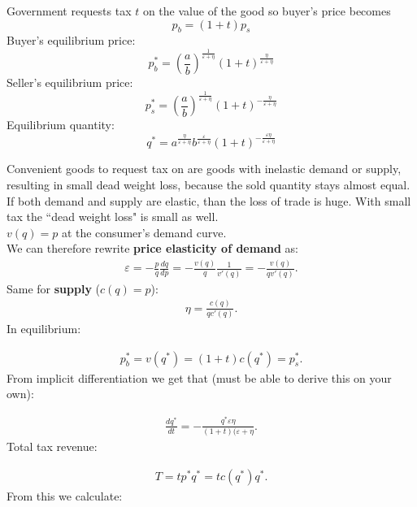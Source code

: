 \documentclass[12pt, a4paper, titlepage]{extarticle}
\begin{document}
	Government requests tax $t$ on the value of the good so buyer's price becomes
	\[p_b = (1 + t)p_s \]
	Buyer's equilibrium price:
	\[p_b^* = (\frac{a}{b})^{\frac{1}{\varepsilon + \eta}}(1 + t)^{\frac{\eta}{\varepsilon + \eta}} \]
	Seller's equilibrium price:
	\[p_s^* = (\frac{a}{b})^{\frac{1}{\varepsilon + \eta}}(1 + t)^{-\frac{\eta}{\varepsilon + \eta}} \]
	Equilibrium quantity:
	\[q^* = a^{\frac{\eta}{\varepsilon + \eta}}b^{\frac{\varepsilon}{\varepsilon + \eta}}(1 + t)^{-\frac{\varepsilon\eta}{\varepsilon + \eta}} \]
	
	Convenient goods to request tax on are goods with inelastic demand or supply, resulting in small dead weight loss, because the sold quantity stays almost equal.\\
	If both demand and supply are elastic, than the loss of trade is huge.
	With small tax the ``dead weight loss" is small as well.
	\\
	$v(q) = p$ at the consumer's demand curve.\\
	We can therefore rewrite \textbf{price elasticity of demand} as:
	\begin{equation}
		\begin{gathered}
			\varepsilon = -\frac{p}{q}\frac{dq}{dp} = -\frac{v(q)}{q}\frac{1}{v'(q)} = -\frac{v(q)}{qv'(q)}.
		\end{gathered}
	\end{equation}
	Same for \textbf{supply} ($c(q) = p$):
	\begin{equation}
		\begin{gathered}
			\eta = \frac{c(q)}{qc'(q)}.
		\end{gathered}
	\end{equation}
	In equilibrium:
	
	\begin{equation}
		\begin{gathered}
			p_b^* = v(q^*) = (1 + t)c(q^*) = p_s^*.
		\end{gathered}
	\end{equation}
	From implicit differentiation we get that (must be able to derive this on your own):
	
	\begin{equation}
		\begin{gathered}
			\frac{dq^*}{dt} = -\frac{q^*\varepsilon\eta}{(1 + t)(\varepsilon + \eta}.
		\end{gathered}
	\end{equation}
	Total tax revenue:
	
	\begin{equation}
		\begin{gathered}
			T = tp^*q^* = tc(q^*)q^*.
		\end{gathered}
	\end{equation}
	From this we calculate:
	
\end{document}

